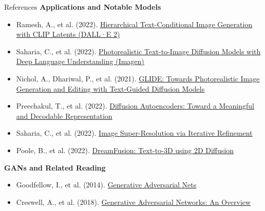 \begin{frame}[allowframebreaks]{References}
\textbf{Applications and Notable Models}
\begin{itemize}
    \item Ramesh, A., et al. (2022). \href{https://arxiv.org/abs/2204.06125}{Hierarchical Text-Conditional Image Generation with CLIP Latents (DALL·E 2)}
    \item Saharia, C., et al. (2022). \href{https://arxiv.org/abs/2205.11487}{Photorealistic Text-to-Image Diffusion Models with Deep Language Understanding (Imagen)}
    \item Nichol, A., Dhariwal, P., et al. (2021). \href{https://arxiv.org/abs/2112.10752}{GLIDE: Towards Photorealistic Image Generation and Editing with Text-Guided Diffusion Models}
    \item Preechakul, T., et al. (2022). \href{https://arxiv.org/abs/2201.09865}{Diffusion Autoencoders: Toward a Meaningful and Decodable Representation}
    \item Saharia, C., et al. (2022). \href{https://arxiv.org/abs/2104.07636}{Image Super-Resolution via Iterative Refinement}
    \item Poole, B., et al. (2022). \href{https://arxiv.org/abs/2206.02736}{DreamFusion: Text-to-3D using 2D Diffusion}
\end{itemize}

\framebreak

\textbf{GANs and Related Reading}
\begin{itemize}
    \item Goodfellow, I., et al. (2014). \href{https://arxiv.org/abs/1406.2661}{Generative Adversarial Nets}
    \item Creswell, A., et al. (2018). \href{https://arxiv.org/abs/1710.07035}{Generative Adversarial Networks: An Overview}
\end{itemize}
\end{frame}